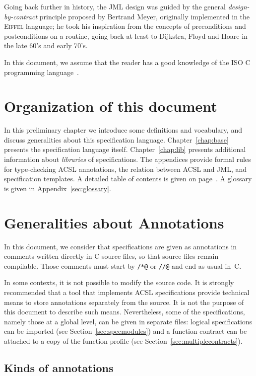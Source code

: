 Going back further in history, the JML design was guided by the general
\emph{design-by-contract} principle proposed by Bertrand Meyer,
originally implemented in
the \textsc{Eiffel} language;
he took his inspiration from the concepts of preconditions and
postconditions on a routine, going back at least to Dijkstra, Floyd and
Hoare in the late 60's and early 70's.

In this document, we assume that the reader has a good knowledge of
the ISO C programming language~\cite{KR88,standardc99}.

\section{Organization of this document}

In this preliminary chapter we introduce some definitions and
vocabulary, and discuss generalities about this specification
language.  Chapter~\ref{chap:base} presents the specification language
itself.  Chapter~\ref{chap:lib} presents additional information about
\emph{libraries} of specifications. The appendices provide
formal rules for type-checking ACSL annotations, 
the relation between ACSL and JML, and specification templates.
A detailed table of
contents is given on page~\pageref{chap:contents}.
A glossary is given in Appendix~\ref{sec:glossary}.

\section{Generalities about Annotations}\label{sec:gener-about-annot}

In this document, we consider that specifications are given as
annotations in comments written directly in C source files, so that
source files remain compilable. Those comments must start by
\verb|/*@| or \verb|//@| and end as usual in~C.

In some contexts, it is not possible to modify the source code.
It is strongly recommended that a tool that implements
ACSL specifications provide technical means to store annotations
separately from the source. It is not the purpose of this document
to describe such means.  Nevertheless, some of the specifications,
namely those at a global level, can be given in separate files:
logical specifications can be imported (see
Section~\ref{sec:specmodules}) and a function contract can be attached
to a copy of the function profile (see
Section~\ref{sec:multiplecontracts}).

\subsection{Kinds of annotations}

